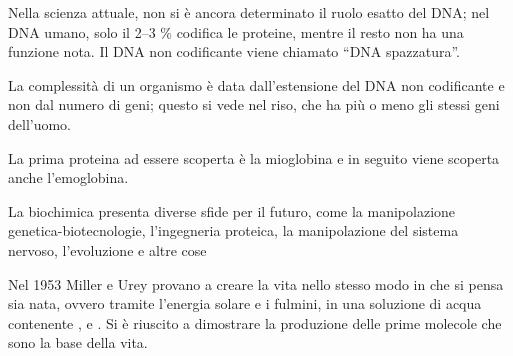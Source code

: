 Nella scienza attuale, non si è ancora determinato il ruolo esatto del
DNA; nel DNA umano, solo il 2--3 \% codifica le proteine, mentre il resto
non ha una funzione nota. Il DNA non codificante viene chiamato ``DNA
spazzatura''.

La complessità di un organismo è data dall'estensione del DNA non
codificante e non dal numero di geni; questo si vede nel riso, che ha
più o meno gli stessi geni dell'uomo.

La prima proteina ad essere scoperta è la mioglobina e in seguito viene
scoperta anche l'emoglobina.

La biochimica presenta diverse sfide per il futuro, come la
manipolazione genetica-biotecnologie, l'ingegneria proteica, la
manipolazione del sistema nervoso, l'evoluzione e altre cose

Nel 1953 Miller e Urey provano a creare la vita nello stesso modo in che
si pensa sia nata, ovvero tramite l'energia solare e i fulmini, in una
soluzione di acqua contenente ,  e . Si è
riuscito a dimostrare la produzione delle prime molecole che sono la
base della vita.


